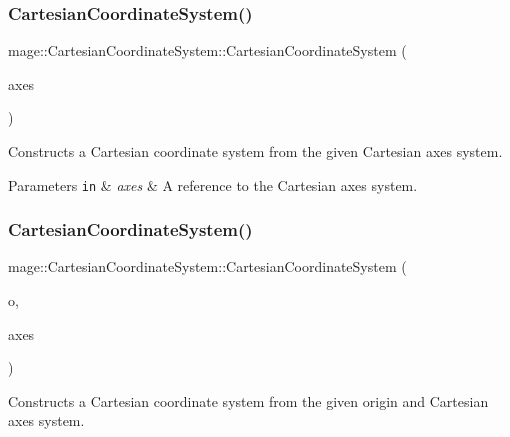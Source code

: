 \subsubsection{\texorpdfstring{Cartesian\+Coordinate\+System()}{CartesianCoordinateSystem()}\hspace{0.1cm}{\footnotesize\ttfamily [1/4]}}
{\footnotesize\ttfamily mage\+::\+Cartesian\+Coordinate\+System\+::\+Cartesian\+Coordinate\+System (\begin{DoxyParamCaption}\item[{const \hyperlink{structmage_1_1_cartesian_axes_system}{Cartesian\+Axes\+System} \&}]{axes }\end{DoxyParamCaption})\hspace{0.3cm}{\ttfamily [explicit]}}

Constructs a Cartesian coordinate system from the given Cartesian axes system.


\begin{DoxyParams}[1]{Parameters}
\mbox{\tt in}  & {\em axes} & A reference to the Cartesian axes system. \\
\hline
\end{DoxyParams}
\hypertarget{structmage_1_1_cartesian_coordinate_system_a31a41ba970f47274c05a6b73b57a5f8f}{}\label{structmage_1_1_cartesian_coordinate_system_a31a41ba970f47274c05a6b73b57a5f8f} 
\subsubsection{\texorpdfstring{Cartesian\+Coordinate\+System()}{CartesianCoordinateSystem()}\hspace{0.1cm}{\footnotesize\ttfamily [2/4]}}
{\footnotesize\ttfamily mage\+::\+Cartesian\+Coordinate\+System\+::\+Cartesian\+Coordinate\+System (\begin{DoxyParamCaption}\item[{F\+X\+M\+V\+E\+C\+T\+OR}]{o,  }\item[{const \hyperlink{structmage_1_1_cartesian_axes_system}{Cartesian\+Axes\+System} \&}]{axes }\end{DoxyParamCaption})\hspace{0.3cm}{\ttfamily [explicit]}}

Constructs a Cartesian coordinate system from the given origin and Cartesian axes system.


